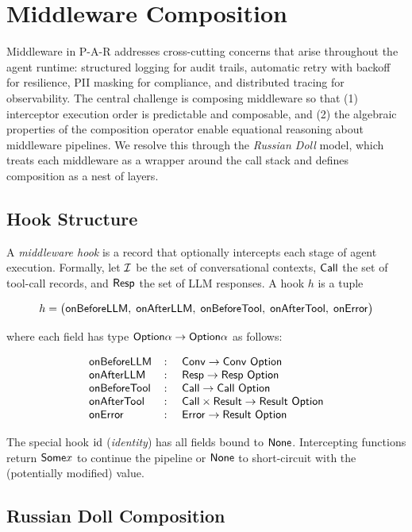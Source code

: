 \section{Middleware Composition}\label{sec:middleware}

Middleware in P-A-R addresses cross-cutting concerns that arise throughout the
agent runtime: structured logging for audit trails, automatic retry with
backoff for resilience, PII masking for compliance, and distributed tracing
for observability.  The central challenge is composing middleware so that (1)
interceptor execution order is predictable and composable, and (2) the
algebraic properties of the composition operator enable equational reasoning
about middleware pipelines.  We resolve this through the \emph{Russian Doll}
model, which treats each middleware as a wrapper around the call stack and
defines composition as a nest of layers.

\subsection{Hook Structure}\label{sec:hook-structure}

A \emph{middleware hook} is a record that optionally intercepts each stage of
agent execution.  Formally, let $\mathcal{I}$ be the set of conversational
contexts, $\mathsf{Call}$ the set of tool-call records, and $\mathsf{Resp}$ the set of LLM
responses.  A hook $h$ is a tuple

\[
h = \bigl(
  \mathsf{onBeforeLLM},\;
  \mathsf{onAfterLLM},\;
  \mathsf{onBeforeTool},\;
  \mathsf{onAfterTool},\;
  \mathsf{onError}
\bigr)
\]

where each field has type $\mathsf{Option}{\alpha \to \mathsf{Option}{\alpha}}$ as follows:

\[
\begin{array}{lcl}
\onBeforeLLM &\colon& \conv \to \conv\ \maybe \\
\onAfterLLM  &\colon& \resp \to \resp\ \maybe \\
\onBeforeTool &\colon& \call \to \call\ \maybe \\
\onAfterTool &\colon& \call \times \myresult \to \myresult\ \maybe \\
\onError &\colon& \myerror \to \myresult\ \maybe
\end{array}
\]

The special hook $\mathrm{id}$ (\emph{identity}) has all fields bound to $\mathsf{None}$.
Intercepting functions return $\mathsf{Some}{x}$ to continue the pipeline or
$\mathsf{None}$ to short-circuit with the (potentially modified) value.

\subsection{Russian Doll Composition}\label{sec:russian-doll}

